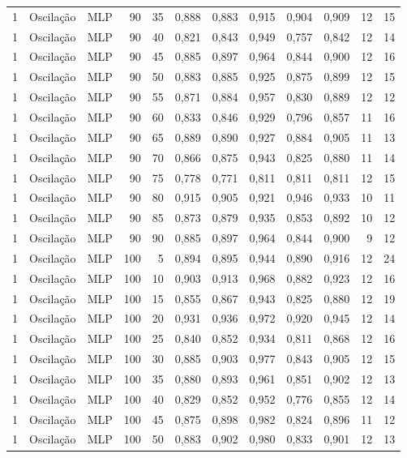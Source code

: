 \begin{longtable}{@{}rllrrrrrrrrr@{}}
1 & Oscilação & MLP & 90 & 35 & 0,888 & 0,883 & 0,915 & 0,904 & 0,909 & 12 & 15 \\
1 & Oscilação & MLP & 90 & 40 & 0,821 & 0,843 & 0,949 & 0,757 & 0,842 & 12 & 14 \\
1 & Oscilação & MLP & 90 & 45 & 0,885 & 0,897 & 0,964 & 0,844 & 0,900 & 12 & 16 \\
1 & Oscilação & MLP & 90 & 50 & 0,883 & 0,885 & 0,925 & 0,875 & 0,899 & 12 & 15 \\
1 & Oscilação & MLP & 90 & 55 & 0,871 & 0,884 & 0,957 & 0,830 & 0,889 & 12 & 12 \\
1 & Oscilação & MLP & 90 & 60 & 0,833 & 0,846 & 0,929 & 0,796 & 0,857 & 11 & 16 \\
1 & Oscilação & MLP & 90 & 65 & 0,889 & 0,890 & 0,927 & 0,884 & 0,905 & 11 & 13 \\
1 & Oscilação & MLP & 90 & 70 & 0,866 & 0,875 & 0,943 & 0,825 & 0,880 & 11 & 14 \\
1 & Oscilação & MLP & 90 & 75 & 0,778 & 0,771 & 0,811 & 0,811 & 0,811 & 12 & 15 \\
1 & Oscilação & MLP & 90 & 80 & 0,915 & 0,905 & 0,921 & 0,946 & 0,933 & 10 & 11 \\
1 & Oscilação & MLP & 90 & 85 & 0,873 & 0,879 & 0,935 & 0,853 & 0,892 & 10 & 12 \\
1 & Oscilação & MLP & 90 & 90 & 0,885 & 0,897 & 0,964 & 0,844 & 0,900 & 9 & 12 \\
1 & Oscilação & MLP & 100 & 5 & 0,894 & 0,895 & 0,944 & 0,890 & 0,916 & 12 & 24 \\
1 & Oscilação & MLP & 100 & 10 & 0,903 & 0,913 & 0,968 & 0,882 & 0,923 & 12 & 16 \\
1 & Oscilação & MLP & 100 & 15 & 0,855 & 0,867 & 0,943 & 0,825 & 0,880 & 12 & 19 \\
1 & Oscilação & MLP & 100 & 20 & 0,931 & 0,936 & 0,972 & 0,920 & 0,945 & 12 & 14 \\
1 & Oscilação & MLP & 100 & 25 & 0,840 & 0,852 & 0,934 & 0,811 & 0,868 & 12 & 16 \\
1 & Oscilação & MLP & 100 & 30 & 0,885 & 0,903 & 0,977 & 0,843 & 0,905 & 12 & 15 \\
1 & Oscilação & MLP & 100 & 35 & 0,880 & 0,893 & 0,961 & 0,851 & 0,902 & 12 & 13 \\
1 & Oscilação & MLP & 100 & 40 & 0,829 & 0,852 & 0,952 & 0,776 & 0,855 & 12 & 14 \\
1 & Oscilação & MLP & 100 & 45 & 0,875 & 0,898 & 0,982 & 0,824 & 0,896 & 11 & 12 \\
1 & Oscilação & MLP & 100 & 50 & 0,883 & 0,902 & 0,980 & 0,833 & 0,901 & 12 & 13 \\

\end{longtable}
